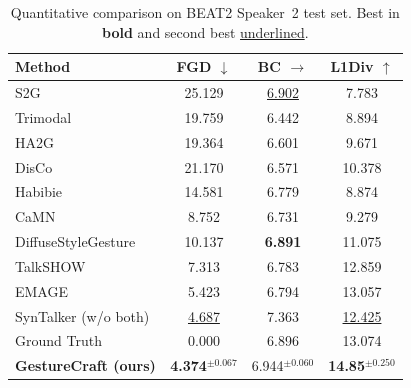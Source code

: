 \begin{table}[t]
\scriptsize
\caption{Quantitative comparison on BEAT2 Speaker~2 test set.
  Best in \textbf{bold} and second best \underline{underlined}.}
\label{tab:results}
\begin{tabular}{lccc}
\toprule
\textbf{Method}
  & \textbf{FGD $\downarrow$}
  & \textbf{BC $\rightarrow$}
  & \textbf{L1Div $\uparrow$} \\
\midrule
S2G~\cite{s2g}
  & 25.129           & \underline{6.902}  & 7.783  \\
Trimodal~\cite{trimodal}
  & 19.759           & 6.442  & 8.894  \\
HA2G~\cite{ha2g}
  & 19.364           & 6.601  & 9.671  \\
DisCo~\cite{disco}
  & 21.170           & 6.571  & 10.378 \\
Habibie~\cite{habibie}
  & 14.581           & 6.779  & 8.874  \\
CaMN~\cite{beat}
  & 8.752            & 6.731  & 9.279  \\
DiffuseStyleGesture~\cite{diffusestylegesture2023}
  & 10.137           & \textbf{6.891}  & 11.075 \\
TalkSHOW~\cite{talkshow2023}
  & 7.313            & 6.783  & 12.859 \\
EMAGE~\cite{emage2024}
  & 5.423            & 6.794  & 13.057 \\
SynTalker (w/o both)~\cite{syntalker}
  & \underline{4.687}& 7.363 & \underline{12.425} \\
\midrule
Ground Truth~\cite{emage2024}
  & 0.000            & 6.896             & 13.074            \\
\midrule
\textbf{GestureCraft (ours)}
  & \textbf{4.374}$^{\scriptstyle \pm 0.067}$
  & 6.944$^{\scriptstyle \pm 0.060}$
  & \textbf{14.85}$^{\scriptstyle \pm 0.250}$ \\
\bottomrule
\end{tabular}
\end{table}

